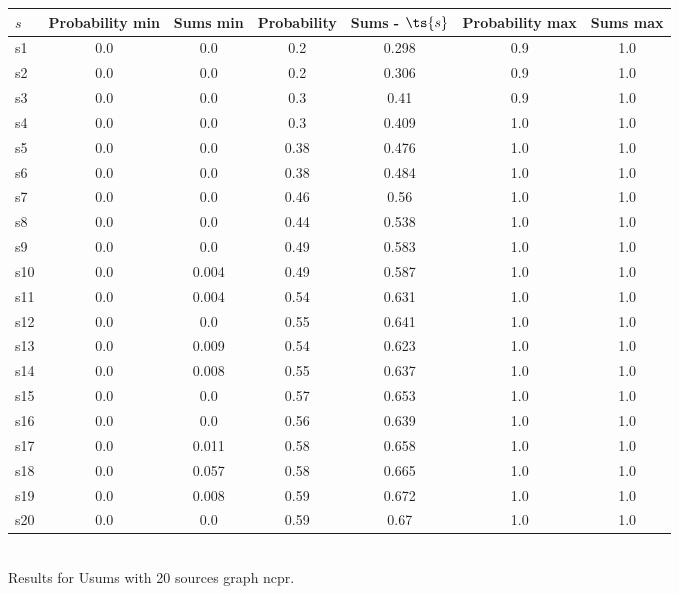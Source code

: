 \documentclass{article}
\begin{document}
\noindent\begin{tabular}{|l|c|c|c|c|c|c|}
\hline
$s$& Probability min & Sums min & Probability & Sums - $\ts{s}$ & Probability max & Sums max\\
\hline
s1 &0.0 & 0.0 & 0.2 & 0.298 & 0.9 & 1.0\\
\hline
s2 &0.0 & 0.0 & 0.2 & 0.306 & 0.9 & 1.0\\
\hline
s3 &0.0 & 0.0 & 0.3 & 0.41 & 0.9 & 1.0\\
\hline
s4 &0.0 & 0.0 & 0.3 & 0.409 & 1.0 & 1.0\\
\hline
s5 &0.0 & 0.0 & 0.38 & 0.476 & 1.0 & 1.0\\
\hline
s6 &0.0 & 0.0 & 0.38 & 0.484 & 1.0 & 1.0\\
\hline
s7 &0.0 & 0.0 & 0.46 & 0.56 & 1.0 & 1.0\\
\hline
s8 &0.0 & 0.0 & 0.44 & 0.538 & 1.0 & 1.0\\
\hline
s9 &0.0 & 0.0 & 0.49 & 0.583 & 1.0 & 1.0\\
\hline
s10 &0.0 & 0.004 & 0.49 & 0.587 & 1.0 & 1.0\\
\hline
s11 &0.0 & 0.004 & 0.54 & 0.631 & 1.0 & 1.0\\
\hline
s12 &0.0 & 0.0 & 0.55 & 0.641 & 1.0 & 1.0\\
\hline
s13 &0.0 & 0.009 & 0.54 & 0.623 & 1.0 & 1.0\\
\hline
s14 &0.0 & 0.008 & 0.55 & 0.637 & 1.0 & 1.0\\
\hline
s15 &0.0 & 0.0 & 0.57 & 0.653 & 1.0 & 1.0\\
\hline
s16 &0.0 & 0.0 & 0.56 & 0.639 & 1.0 & 1.0\\
\hline
s17 &0.0 & 0.011 & 0.58 & 0.658 & 1.0 & 1.0\\
\hline
s18 &0.0 & 0.057 & 0.58 & 0.665 & 1.0 & 1.0\\
\hline
s19 &0.0 & 0.008 & 0.59 & 0.672 & 1.0 & 1.0\\
\hline
s20 &0.0 & 0.0 & 0.59 & 0.67 & 1.0 & 1.0\\
\hline
\end{tabular}\\

\noindent Results for Usums with 20 sources graph ncpr.
\end{document}
